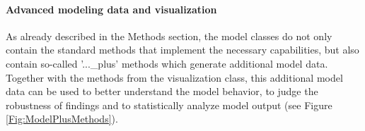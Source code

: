 \documentclass[a4paper,10pt]{article}
\begin{document}
\paragraph{Advanced modeling data and visualization}
As already described in the Methods section, the model classes do not only contain the standard methods that implement the necessary capabilities, but also contain so-called '...\_plus' methods 
which generate additional model data. Together with the methods from the visualization class, this additional model data can be used to better understand the model behavior, 
to judge the robustness of findings and to statistically analyze model output (see Figure \ref{Fig:ModelPlusMethods}).

\begin{figure}

\end{figure}
\end{document}
